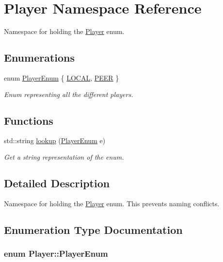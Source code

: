 \hypertarget{namespacePlayer}{
\section{Player Namespace Reference}
\label{namespacePlayer}
}


Namespace for holding the \hyperlink{namespacePlayer}{Player} enum.  


\subsection*{Enumerations}
\begin{DoxyCompactItemize}
\item 
enum \hyperlink{namespacePlayer_acc4ced29e6b7e20f602b3c8b60c75228}{PlayerEnum} \{ \hyperlink{namespacePlayer_acc4ced29e6b7e20f602b3c8b60c75228ac52d4045c2632821a9e80c59b6c10afa}{LOCAL}, 
\hyperlink{namespacePlayer_acc4ced29e6b7e20f602b3c8b60c75228ac4a95e4ec7963067fee5dde82109a176}{PEER}
 \}
\begin{DoxyCompactList}\small\item\em Enum representing all the different players. \item\end{DoxyCompactList}\end{DoxyCompactItemize}
\subsection*{Functions}
\begin{DoxyCompactItemize}
\item 
std::string \hyperlink{namespacePlayer_ae15faf81fe35ffe9a4fa51b686fe01fb}{lookup} (\hyperlink{namespacePlayer_acc4ced29e6b7e20f602b3c8b60c75228}{PlayerEnum} e)
\begin{DoxyCompactList}\small\item\em Get a string representation of the enum. \item\end{DoxyCompactList}\end{DoxyCompactItemize}


\subsection{Detailed Description}
Namespace for holding the \hyperlink{namespacePlayer}{Player} enum. This prevents naming conflicts. 

\subsection{Enumeration Type Documentation}
\hypertarget{namespacePlayer_acc4ced29e6b7e20f602b3c8b60c75228}{
\subsubsection[{PlayerEnum}]{\setlength{\rightskip}{0pt plus 5cm}enum {\bf Player::PlayerEnum}}}
\label{namespacePlayer_acc4ced29e6b7e20f602b3c8b60c75228}



